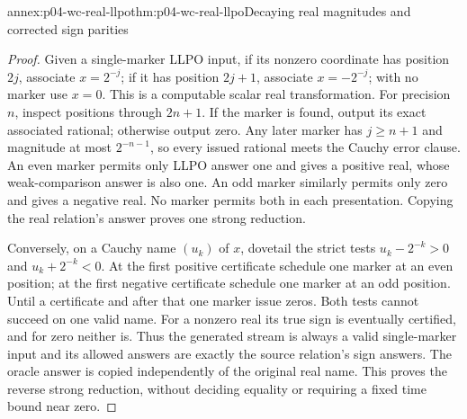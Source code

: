 \begin{annexitem}{annex:p04-wc-real-llpo}{thm:p04-wc-real-llpo}{Decaying real magnitudes and corrected sign parities}
\begin{proof}
Given a single-marker LLPO input, if its nonzero coordinate has
position \(2j\), associate \(x=2^{-j}\); if it has position
\(2j+1\), associate \(x=-2^{-j}\); with no marker use \(x=0\).
This is a computable scalar real transformation. For precision \(n\),
inspect positions through \(2n+1\). If the marker is found, output
its exact associated rational; otherwise output zero. Any later marker
has \(j\geq n+1\) and magnitude at most \(2^{-n-1}\), so every
issued rational meets the Cauchy error clause. An even marker permits
only LLPO answer one and gives a positive real, whose weak-comparison
answer is also one. An odd marker similarly permits only zero and
gives a negative real. No marker permits both in each presentation.
Copying the real relation's answer proves one strong reduction.

Conversely, on a Cauchy name \((u_k)\) of \(x\), dovetail the
strict tests \(u_k-2^{-k}>0\) and \(u_k+2^{-k}<0\).
At the first positive certificate schedule one marker at an even
position; at the first negative certificate schedule one marker at
an odd position. Until a certificate and after that one marker issue
zeros. Both tests cannot succeed on one valid name. For a nonzero
real its true sign is eventually certified, and for zero neither is.
Thus the generated stream is always a valid single-marker input and
its allowed answers are exactly the source relation's sign answers.
The oracle answer is copied independently of the original real name.
This proves the reverse strong reduction, without deciding equality
or requiring a fixed time bound near zero.
\end{proof}
\end{annexitem}

